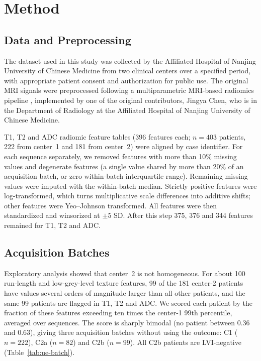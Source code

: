 \documentclass[conference]{IEEEtran}
\begin{document}
\section{Method}

\subsection{Data and Preprocessing}

The dataset used in this study was collected by the Affiliated Hospital of Nanjing University of Chinese Medicine from two clinical centers over a specified period, with appropriate patient consent and authorization for public use. The original MRI signals were preprocessed following a multiparametric MRI-based radiomics pipeline \cite{cao2024multiparameter}, implemented by one of the original contributors, Jingya Chen, who is in the Department of Radiology at the Affiliated Hospital of Nanjing University of Chinese Medicine.

T1, T2 and ADC radiomic feature tables (396 features each; $n=403$ patients, 222 from center~1 and 181 from center~2) were aligned by case identifier. For each sequence separately, we removed features with more than 10\% missing values and degenerate features (a single value shared by more than 20\% of an acquisition batch, or zero within-batch interquartile range). Remaining missing values were imputed with the within-batch median. Strictly positive features were log-transformed, which turns multiplicative scale differences into additive shifts; other features were Yeo--Johnson transformed. All features were then standardized and winsorized at $\pm5$ SD. After this step 375, 376 and 344 features remained for T1, T2 and ADC.

\subsection{Acquisition Batches}

Exploratory analysis showed that center~2 is not homogeneous. For about 100 run-length and low-grey-level texture features, 99 of the 181 center-2 patients have values several orders of magnitude larger than all other patients, and the same 99 patients are flagged in T1, T2 and ADC. We scored each patient by the fraction of these features exceeding ten times the center-1 99th percentile, averaged over sequences. The score is sharply bimodal (no patient between 0.36 and 0.63), giving three acquisition batches without using the outcome: C1 ($n=222$), C2a ($n=82$) and C2b ($n=99$). All C2b patients are LVI-negative (Table~\ref{tab:ue-batch}).
\end{document}
